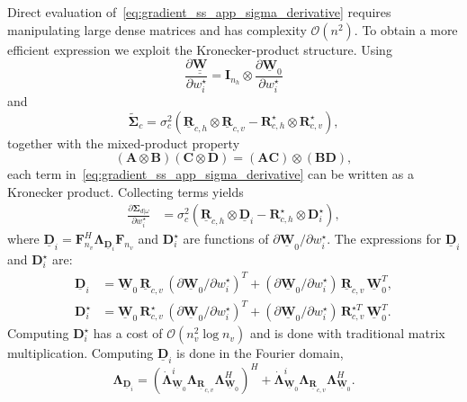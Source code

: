 \documentclass[12pt]{article}
\newcommand{\mycirc}[1] {\underline{\bm{#1}}}
\newcommand{\mybcirc}[1] {\underline{\underline{\bm{#1}}}}
\begin{document}
Direct evaluation of~\eqref{eq:gradient_ss_app_sigma_derivative}
requires manipulating large dense matrices and has complexity
$\mathcal{O}(n^2)$. To obtain a more efficient expression we exploit the Kronecker-product structure. Using
\begin{equation}
    \frac{\partial \mybcirc{W}}
    {\partial w_i^\star}
    =
    \bm{I}_{n_h}
    \otimes
    \frac{\partial \mycirc{W}_0}
    {\partial w_i^\star}
\end{equation}
and
\begin{equation}
    \tilde{\bm{\Sigma}}_c
    =
    \sigma_c^2
    \left(
        \mycirc{R}_{c,h}
        \otimes
        \mycirc{R}_{c,v}
        -
        \bm{R}_{c,h}^{\star}
        \otimes
        \bm{R}_{c,v}^{\star}
    \right),
\end{equation}
together with the mixed-product property
\begin{equation}
    (\bm{A}\otimes\bm{B})
    (\bm{C}\otimes\bm{D})
    =
    (\bm{A}\bm{C})
    \otimes
    (\bm{B}\bm{D}),
\end{equation}
each term in~\eqref{eq:gradient_ss_app_sigma_derivative}
can be written as a Kronecker product. Collecting terms yields
\begin{equation}
\label{eq:gradient_ss_app_sigma_derivative_efficient}
\begin{split}
    \frac{\partial \bm{\Sigma}_{d|\omega}}
    {\partial w_i^\star}
    &=
    \sigma_c^2
    \left(
        \mycirc{R}_{c,h}
        \otimes
        \mycirc{D}_i
        -
        \bm{R}_{c,h}^{\star}
        \otimes
        \bm{D}_i^{\star}
    \right),
\end{split}
\end{equation}
where
$\mycirc{D}_i=\bm{F}_{n_v}^{H}\bm{\Lambda}_{\mycirc{D}_i} \bm{F}_{n_v}$
and $\bm{D}_i^\star$ are functions of
$\partial \mycirc{W}_0/\partial w_i^\star$.
The expressions for $\mycirc{D}_i$ and $\bm{D}_i^{\star}$ are:
\begin{equation*}
\begin{aligned}
\mycirc{D}_{ i} &= \mycirc{W}_0 \, \mycirc{R}_{c, v} \, (\partial \mycirc{W}_0 / \partial w_i^{\star})^T + (\partial \mycirc{W}_0 / \partial w_i^{\star}) \, \mycirc{R}_{c, v} \, \mycirc{W}_0^T, \\
\bm{D}_{i}^{\star} &= \mycirc{W}_0 \, \bm{R}_{c, v}^{\star} \, (\partial \mycirc{W}_0 / \partial w_i^{\star})^T +  (\partial \mycirc{W}_0 / \partial w_i^{\star}) \, \bm{R}_{c, v}^{\star T} \, \mycirc{W}_0^T.   
\end{aligned}
\end{equation*}
Computing $\bm{D}_i^{\star}$ has a cost of $\mathcal{O}(n_v^2 \log{n_v})$ and is done with traditional matrix multiplication.
Computing $\mycirc{D}_i$ is done in the Fourier domain, 
\begin{equation*}
    \bm{\Lambda}_{\mycirc{D}_i} 
    = (\dot{\bm{\Lambda}}_{\mycirc{W}_0}^{i}  \bm{\Lambda}_{\mycirc{R}_{c, v}} \bm{\Lambda}_{\mycirc{W}_0}^{H})^H
    +  \dot{\bm{\Lambda}}_{\mycirc{W}_0}^{i}  \bm{\Lambda}_{\mycirc{R}_{c, v}} \bm{\Lambda}_{\mycirc{W}_0}^{H}.
\end{equation*}
\end{document}
